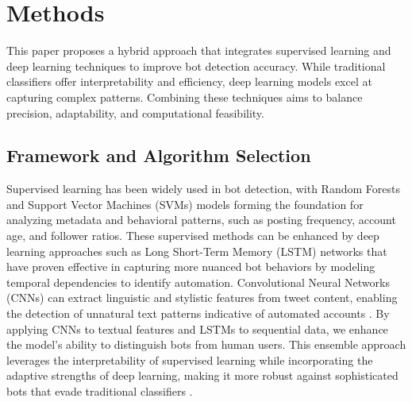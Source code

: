 \documentclass[10pt,twocolumn]{article}
\begin{document}
\section{Methods}
This paper proposes a hybrid approach that integrates supervised learning and deep learning techniques to improve bot detection accuracy. While traditional classifiers offer interpretability and efficiency, deep learning models excel at capturing complex patterns. Combining these techniques aims to balance precision, adaptability, and computational feasibility.

\subsection{Framework and Algorithm Selection}
Supervised learning has been widely used in bot detection, with Random Forests and Support Vector Machines (SVMs) models forming the foundation for analyzing metadata and behavioral patterns, such as posting frequency, account age, and follower ratios. These supervised methods can be enhanced by deep learning approaches such as Long Short-Term Memory (LSTM) networks that have proven effective in capturing more nuanced bot behaviors by modeling temporal dependencies to identify automation. Convolutional Neural Networks (CNNs) can extract linguistic and stylistic features from tweet content, enabling the detection of unnatural text patterns indicative of automated accounts \cite{Akyon2019}. By applying CNNs to textual features and LSTMs to sequential data, we enhance the model’s ability to distinguish bots from human users. This ensemble approach leverages the interpretability of supervised learning while incorporating the adaptive strengths of deep learning, making it more robust against sophisticated bots that evade traditional classifiers \cite{Hayawi2023}.
\end{document}
